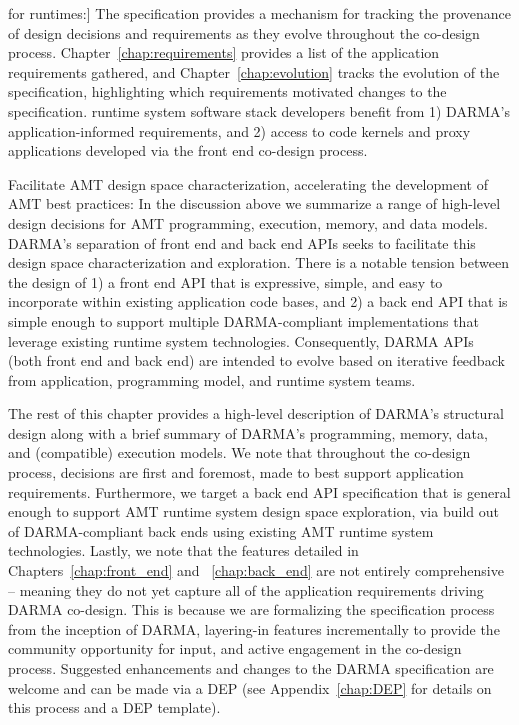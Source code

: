 \begin{compactdesc}
  for runtimes:]
  The specification provides a mechanism for tracking the
  provenance of design decisions and requirements as they evolve throughout the
  \gls{co-design} process. Chapter~\ref{chap:requirements} provides a list of the application
  requirements gathered,  and Chapter~\ref{chap:evolution} tracks the evolution of
  the specification, highlighting which requirements motivated changes to the specification.
  \Gls{runtime system} software stack developers benefit 
  from 1) \gls{DARMA}’s application-informed requirements, and 2) access to code
  kernels and proxy applications developed via the \gls{front end}
  \gls{co-design} process.
\item[Facilitate AMT design space characterization, accelerating the
development of AMT best practices:]
  In the discussion above we summarize a range of high-level design decisions for
  \gls{AMT} programming, execution, memory, and data models. \gls{DARMA}'s
  separation of \gls{front end} and \gls{back end} \glspl{API} seeks to
  facilitate this design space characterization and exploration.  There 
  is a notable tension between the design of 1) a \gls{front end} \gls{API} that is expressive, simple, 
  and easy to incorporate within existing application code bases, and 2) a
  \gls{back end} \gls{API} that is simple enough 
  to support multiple \gls{DARMA}-compliant implementations that leverage existing \gls{runtime
  system} technologies. 
  Consequently, \gls{DARMA} \gls{API}s (both \gls{front end} and \gls{back end}) are
  intended to evolve based on iterative feedback from 
  application, \gls{programming model}, and \gls{runtime system} teams. 
\end{compactdesc}


The rest of this chapter provides a high-level description of 
\gls{DARMA}'s structural design  along with a brief summary of \gls{DARMA}'s programming,
memory, data, and (compatible) execution models. We note that throughout the
\gls{co-design} process, decisions are first and foremost, 
made to best support application requirements.  Furthermore, we target a
\gls{back end} \gls{API} specification that is general enough to support 
\gls{AMT} \gls{runtime system}
design space exploration, via build out of \gls{DARMA}-compliant
back ends using existing \gls{AMT} \gls{runtime system}
technologies.
Lastly, we note that the features detailed in Chapters~\ref{chap:front_end} and
~\ref{chap:back_end}  are not entirely comprehensive -- meaning they do not yet capture all of the
application requirements driving \gls{DARMA} \gls{co-design}.  This is because 
we are formalizing the specification process from the inception of \gls{DARMA}, layering-in features incrementally to
provide the community opportunity for input, and active engagement in the
\gls{co-design} process.  Suggested enhancements and changes 
to the \gls{DARMA} specification are welcome and can be made via a \gls{DEP} (see
Appendix~\ref{chap:DEP} for details on this process and a \gls{DEP} template). 

